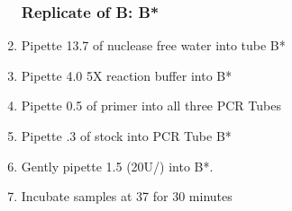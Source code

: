 \documentclass{ssiBio}
\begin{document}
\begin{enumerate}
\subsubsection{Replicate of B: B*}
\item{Pipette 13.7\uL{} of nuclease free water into tube B*\label{B1}}
\item{Pipette 4.0\uL{} 5X \tdt{} reaction buffer into B*\label{B2}}
\item{Pipette 0.5\uL{} of primer into all three PCR Tubes\label{B3}}
\item{Pipette .3\uL{} of \BdATP{} stock into PCR Tube B*\label{B4}}
\item{Gently pipette 1.5\uL{} \tdt (20U/\uL{}) into B*.\label{B5}}
\vspace{3mm}
\item{Incubate samples at 37\C{} for 30 minutes}\\
\stopPoint{} 

\end{enumerate}
\end{document}

